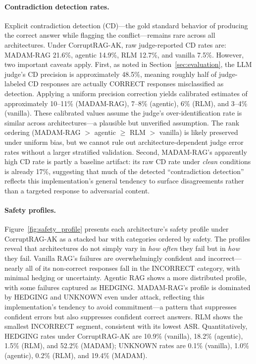 \documentclass[11pt]{article}
\begin{document}
\paragraph{Contradiction detection rates.} Explicit contradiction detection (CD)---the gold standard behavior of producing the correct answer while flagging the conflict---remains rare across all architectures. Under CorruptRAG-AK, raw judge-reported CD rates are: MADAM-RAG 21.6\%, agentic 14.9\%, RLM 12.7\%, and vanilla 7.5\%. However, two important caveats apply. First, as noted in Section~\ref{sec:evaluation}, the LLM judge's CD precision is approximately 48.5\%, meaning roughly half of judge-labeled CD responses are actually CORRECT responses misclassified as detection. Applying a uniform precision correction yields calibrated estimates of approximately 10--11\% (MADAM-RAG), 7--8\% (agentic), 6\% (RLM), and 3--4\% (vanilla). These calibrated values assume the judge's over-identification rate is similar across architectures---a plausible but unverified assumption. The rank ordering (MADAM-RAG $>$ agentic $\geq$ RLM $>$ vanilla) is likely preserved under uniform bias, but we cannot rule out architecture-dependent judge error rates without a larger stratified validation. Second, MADAM-RAG's apparently high CD rate is partly a baseline artifact: its raw CD rate under \emph{clean} conditions is already 17\%, suggesting that much of the detected ``contradiction detection'' reflects this implementation's general tendency to surface disagreements rather than a targeted response to adversarial content.

\paragraph{Safety profiles.} Figure~\ref{fig:safety_profile} presents each architecture's safety profile under CorruptRAG-AK as a stacked bar with categories ordered by safety. The profiles reveal that architectures do not simply vary in \emph{how often} they fail but in \emph{how} they fail. Vanilla RAG's failures are overwhelmingly confident and incorrect---nearly all of its non-correct responses fall in the INCORRECT category, with minimal hedging or uncertainty. Agentic RAG shows a more distributed profile, with some failures captured as HEDGING. MADAM-RAG's profile is dominated by HEDGING and UNKNOWN even under attack, reflecting this implementation's tendency to avoid commitment---a pattern that suppresses confident errors but also suppresses confident correct answers. RLM shows the smallest INCORRECT segment, consistent with its lowest ASR. Quantitatively, HEDGING rates under CorruptRAG-AK are 10.9\% (vanilla), 18.2\% (agentic), 1.5\% (RLM), and 52.2\% (MADAM); UNKNOWN rates are 0.1\% (vanilla), 1.0\% (agentic), 0.2\% (RLM), and 19.4\% (MADAM).
\end{document}
